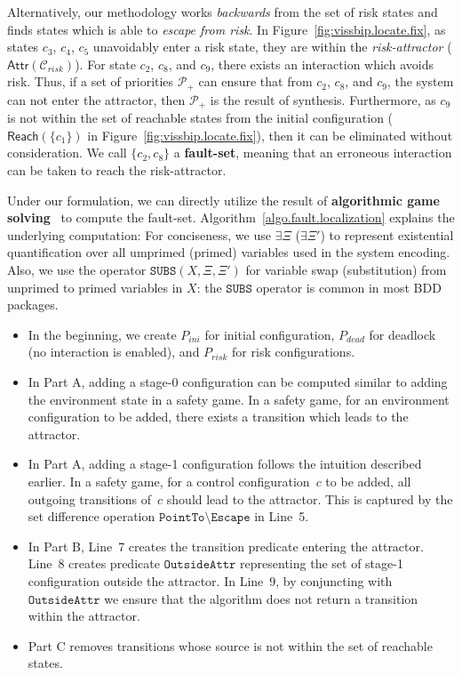 \documentclass[10pt, a4paper, onecolumn, conference, compsocconf]{IEEEtran}
\begin{document}
Alternatively, our methodology works \emph{backwards} from the set of risk states and finds states which is able to \emph{escape from risk}. In Figure~\ref{fig:vissbip.locate.fix}, as states $c_3$, $c_4$, $c_5$ unavoidably enter a risk state, they are within the \emph{risk-attractor} ($\textsf{Attr}(\mathcal{C}_{risk})$). For state $c_2$, $c_8$, and $c_9$, there exists an interaction which avoids risk. Thus, if a set of priorities $\mathcal{P}_{+}$ can ensure that from $c_2$, $c_8$, and $c_9$, the system can not enter the attractor, then $\mathcal{P}_{+}$ is the result of synthesis. Furthermore, as $c_9$ is not within the set of reachable states from the initial configuration ($\textsf{Reach}(\{c_1\})$ in Figure~\ref{fig:vissbip.locate.fix}), then it can be eliminated without consideration. We call $\{c_2, c_8\}$ a \textbf{fault-set}, meaning that an erroneous interaction can be taken to reach the risk-attractor.


Under our formulation, we can directly utilize the result of \textbf{algorithmic game solving}~\cite{gradel:2002:automata} to compute the
fault-set. Algorithm~\ref{algo.fault.localization} explains the underlying computation: For conciseness, we use $\exists \Xi$ ($\exists \Xi'$) to represent existential quantification over all umprimed (primed) variables used in the system encoding. Also, we use the operator $\texttt{SUBS}(X, \Xi, \Xi')$ for variable swap (substitution) from unprimed to primed variables in $X$: the $\texttt{SUBS}$ operator
is common in most BDD packages.

\begin{itemize}
    \item In the beginning, we create $P_{ini}$ for initial configuration,  $P_{dead}$ for deadlock (no interaction is enabled), and $P_{risk}$ for risk configurations.
    \item In Part A, adding a stage-0 configuration can be computed similar to adding the environment state in a safety game. In a safety game, for an environment configuration to be added, there exists a transition which leads to the attractor.
    \item In Part A, adding a stage-1 configuration follows the intuition described earlier. In a safety game, for a control configuration~$c$ to be added, all outgoing transitions of~$c$ should lead to the attractor. This is captured by the set difference operation $\texttt{PointTo} \setminus \texttt{Escape}$ in Line~5.
    \item In Part B, Line~7 creates the transition predicate entering the attractor. Line~8 creates predicate $\texttt{OutsideAttr}$ representing the set of stage-1 configuration outside the attractor. In Line~9, by conjuncting with $\texttt{OutsideAttr}$ we ensure that the algorithm does not return a transition within the attractor.
    \item Part C removes transitions whose source is not within the set of reachable states.
\end{itemize}
\end{document}
